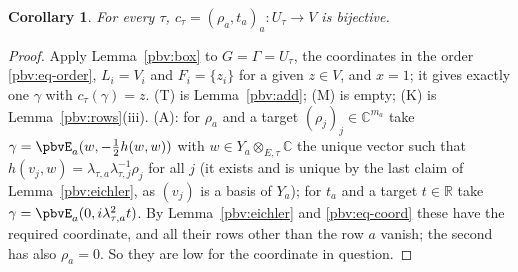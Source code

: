 \documentclass[10pt]{amsart}
\newtheorem{corollary}[theorem]{Corollary}
\theoremstyle{definition}
\theoremstyle{remark}
\newcommand{\C}{\mathbb C}
\newcommand{\R}{\mathbb R}
\begin{document}
\begin{corollary}\label{pbv:bij}
For every $\tau$, $c_\tau=(\rho_a,t_a)_a\colon U_\tau\to V$ is bijective.
\end{corollary}
\begin{proof}
Apply Lemma~\ref{pbv:box} to $G=\Gamma=U_\tau$, the coordinates in the order \eqref{pbv:eq-order}, $L_i=V_i$ and
$F_i=\{z_i\}$ for a given $z\in V$, and $x=1$; it gives exactly one $\gamma$ with $c_\tau(\gamma)=z$. (T) is
Lemma~\ref{pbv:add}; (M) is empty; (K) is Lemma~\ref{pbv:rows}(iii). (A): for $\rho_a$ and a target
$(\rho_j)_j\in\C^{m_a}$ take $\gamma=\pbvE_a(w,-\frac12h(w,w))$ with $w\in Y_a\otimes_{E,\tau}\C$ the unique vector such that $h(v_j,w)=
\lambda_{\tau,a}\lambda_{\tau,j}^{-1}\rho_j$ for all $j$ (it exists and is unique by the last claim of Lemma~\ref{pbv:eichler}, as $(v_j)$ is a basis of $Y_a$); for $t_a$ and a target
$t\in\R$ take $\gamma=\pbvE_a(0,i\lambda_{\tau,a}^2t)$. By Lemma~\ref{pbv:eichler} and \eqref{pbv:eq-coord}
these have the required coordinate, and all their rows other than the row $a$ vanish; the second has
also $\rho_a=0$. So they are low for the coordinate in question.
\end{proof}
\end{document}
